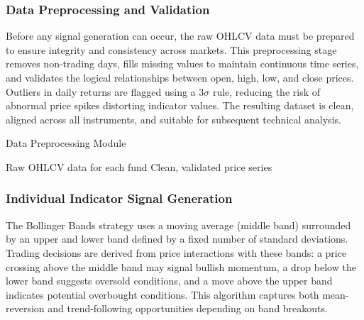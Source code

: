 \subsubsection{Data Preprocessing and Validation}

Before any signal generation can occur, the raw OHLCV data must be prepared to ensure integrity and consistency across markets. This preprocessing stage removes non-trading days, fills missing values to maintain continuous time series, and validates the logical relationships between open, high, low, and close prices. Outliers in daily returns are flagged using a $3\sigma$ rule, reducing the risk of abnormal price spikes distorting indicator values. The resulting dataset is clean, aligned across all instruments, and suitable for subsequent technical analysis.

\begin{breakablealgorithm}
\caption{Data Preprocessing Module}
\begin{algorithmic}[1]
\Require Raw OHLCV data for each fund
\Ensure Clean, validated price series
\end{algorithmic}
\end{breakablealgorithm}

\subsubsection{Individual Indicator Signal Generation}

The Bollinger Bands strategy uses a moving average (middle band) surrounded by an upper and lower band defined by a fixed number of standard deviations. Trading decisions are derived from price interactions with these bands: a price crossing above the middle band may signal bullish momentum, a drop below the lower band suggests oversold conditions, and a move above the upper band indicates potential overbought conditions. This algorithm captures both mean-reversion and trend-following opportunities depending on band breakouts.

